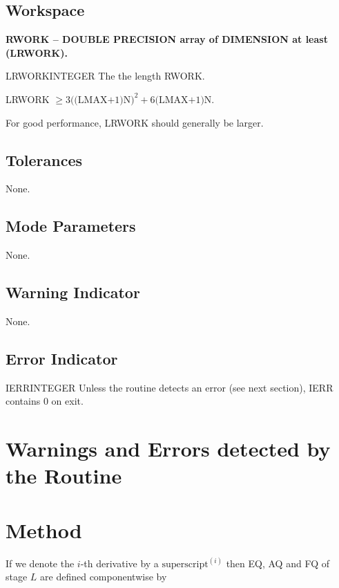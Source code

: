 \subsection{Workspace}
\noindent
{\bf RWORK -- {DOUBLE PRECISION array of DIMENSION at least (LRWORK)}.}
\medskip

\begin{entry}{LRWORK}{INTEGER}
  The the length RWORK. 

  LRWORK $\ge 3 \mbox{((LMAX+1)N)}^2 + 6 \mbox{(LMAX+1)N}$.

  For good performance, LRWORK should generally be larger.
\end{entry}

\subsection{Tolerances}
None.

\subsection{Mode Parameters}
None.

\subsection{Warning Indicator}
None.

\subsection{Error Indicator}

\begin{entry}{IERR}{INTEGER}
  Unless the routine detects an error (see next section), IERR
  contains $0$ on exit.
\end{entry}

\section{Warnings and Errors detected by the Routine}


\section{Method}
If we denote the
$i$-th derivative by a $\mbox{superscript}^{(i)}$ then EQ, AQ and
FQ of stage $L$ are defined componentwise by


